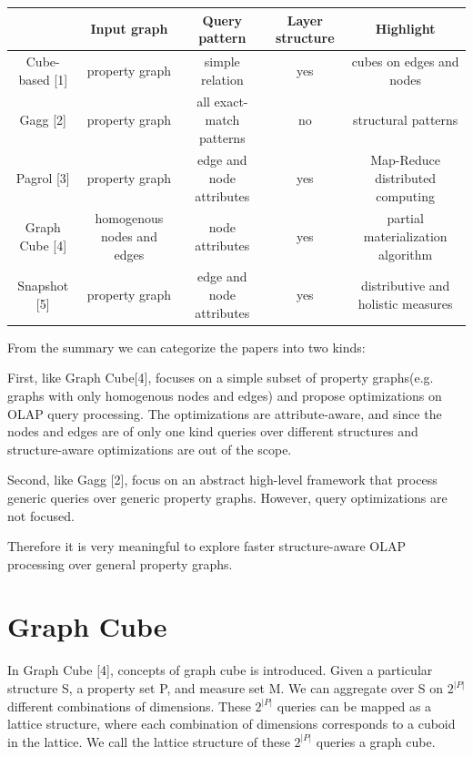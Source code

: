  \begin{center}
 	\begin{tabular}{ | c | c | c | c | c |  } 
 		\hline 
 		 & Input graph & Query pattern & Layer structure & Highlight\\ \hline Cube-based [1] & property graph & simple relation & yes & cubes on edges and nodes\\ \hline Gagg [2] & property graph & all exact-match patterns & no & structural patterns\\ \hline Pagrol [3] & property graph & edge and node attributes & yes & Map-Reduce distributed computing\\ \hline Graph Cube [4] & homogenous nodes and edges & node attributes & yes & partial materialization algorithm\\ \hline Snapshot [5] & property graph & edge and node attributes & yes & distributive and holistic measures\\ \hline 
 		 
 	\end{tabular}
 	\end {center}

 
 
From the summary we can categorize the papers into two kinds: 
 
First, like Graph Cube[4], focuses on a simple subset of property graphs(e.g. graphs with only homogenous nodes and edges) and propose optimizations on OLAP query processing. The optimizations are attribute-aware, and since the nodes and edges are of only one kind queries over different structures and structure-aware optimizations are out of the scope. 
 
Second, like Gagg [2], focus on an abstract high-level framework that process generic queries over generic property graphs. However, query optimizations are not focused.  
 
Therefore it is very meaningful to explore faster structure-aware OLAP processing over general property graphs.



\section{Graph Cube}

In Graph Cube [4], concepts of graph cube is introduced. Given a particular structure S, a property set P, and measure set M. We can aggregate over S on $2^{|P|}$ different combinations of dimensions. These $2^{|P|}$ queries can be mapped as a lattice structure, where each combination of dimensions corresponds to a cuboid in the lattice. We call the lattice structure of these $2^{|P|}$ queries a graph cube.

